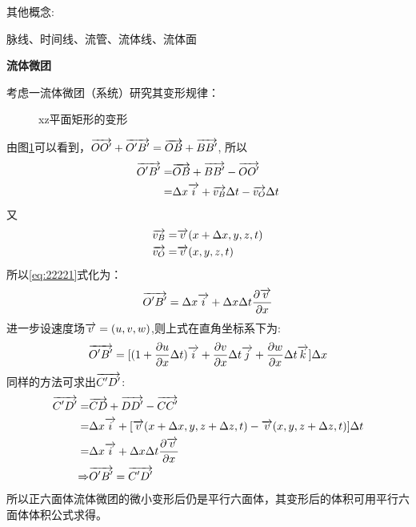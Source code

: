 其他概念:

脉线、时间线、流管、流体线、流体面

\textbf{流体微团}


考虑一流体微团（系统）研究其变形规律：
\begin{figure}[!ht]
\def\svgwidth{8cm}
\centering

\caption{xz平面矩形的变形}\label{fig:221}
\end{figure}
由图\ref{fig:221}可以看到，$\overrightarrow{OO'}+\overrightarrow{O'B'}=\overrightarrow{OB}+\overrightarrow{BB'}$,
所以
\begin{align}\label{eq:22221}
\overrightarrow{O'B'}=&\overrightarrow{OB}+\overrightarrow{BB'}-\overrightarrow{OO'}\nonumber\\
=&\Delta x \overrightarrow{i}+\overrightarrow{v_B}\Delta t - \overrightarrow{v_O} \Delta t
\end{align}
又
\begin{align*}
\overrightarrow{v_B}=&\overrightarrow{v}(x+\Delta x,y,z,t)\\
\overrightarrow{v_O}=&\overrightarrow{v}(x,y,z,t)
\end{align*}
所以\eqref{eq:22221}式化为：
\begin{equation}
\overrightarrow{O'B'}=\Delta x \overrightarrow{i} + \Delta x\Delta t \frac{\partial \overrightarrow{v}}{\partial x}
\end{equation}
进一步设速度场$\overrightarrow{v}=(u,v,w)$,则上式在直角坐标系下为:
\begin{equation}\label{eq:222}
\overrightarrow{O'B'}=[(1+\frac{\partial u}{\partial x}\Delta t)\overrightarrow{i}+\frac{\partial v}{\partial x}\Delta t\overrightarrow{j}+\frac{\partial w}{\partial x}\Delta t\overrightarrow{k}]\Delta x
\end{equation}
同样的方法可求出$\overrightarrow{C'D'}$:
\begin{align*}
\overrightarrow{C'D'}=&\overrightarrow{CD}+\overrightarrow{DD'}-\overrightarrow{CC'}\\
=&\Delta x\overrightarrow{i}+[\overrightarrow{v}(x+\Delta x,y,z+\Delta z,t)-\overrightarrow{v}(x,y,z+\Delta z,t)]\Delta t\\
=&\Delta x \overrightarrow{i} +  \Delta x\Delta t \frac{\partial \overrightarrow{v}}{\partial x}\\
\Rightarrow & \overrightarrow{O'B'}=\overrightarrow{C'D'}
\end{align*}
所以正六面体流体微团的微小变形后仍是平行六面体，其变形后的体积可用平行六面体体积公式求得。

